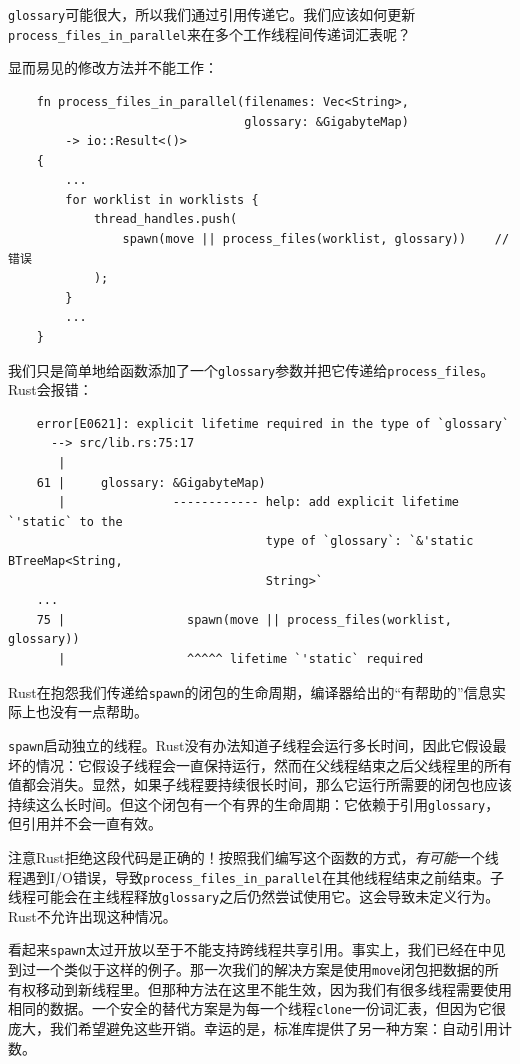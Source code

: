 \texttt{glossary}可能很大，所以我们通过引用传递它。我们应该如何更新\\
\texttt{process\_files\_in\_parallel}来在多个工作线程间传递词汇表呢？

显而易见的修改方法并不能工作：
\begin{verbatim}
    fn process_files_in_parallel(filenames: Vec<String>,
                                 glossary: &GigabyteMap)
        -> io::Result<()>
    {
        ...
        for worklist in worklists {
            thread_handles.push(
                spawn(move || process_files(worklist, glossary))    // 错误
            );
        }
        ...
    }
\end{verbatim}

我们只是简单地给函数添加了一个\texttt{glossary}参数并把它传递给\texttt{process\_files}。Rust会报错：
\begin{verbatim}
    error[E0621]: explicit lifetime required in the type of `glossary`
      --> src/lib.rs:75:17
       |
    61 |     glossary: &GigabyteMap)
       |               ------------ help: add explicit lifetime `'static` to the 
                                    type of `glossary`: `&'static BTreeMap<String,
                                    String>`
    ...
    75 |                 spawn(move || process_files(worklist, glossary))
       |                 ^^^^^ lifetime `'static` required
\end{verbatim}

Rust在抱怨我们传递给\texttt{spawn}的闭包的生命周期，编译器给出的“有帮助的”信息实际上也没有一点帮助。

\texttt{spawn}启动独立的线程。Rust没有办法知道子线程会运行多长时间，因此它假设最坏的情况：它假设子线程会一直保持运行，然而在父线程结束之后父线程里的所有值都会消失。显然，如果子线程要持续很长时间，那么它运行所需要的闭包也应该持续这么长时间。但这个闭包有一个有界的生命周期：它依赖于引用\texttt{glossary}，但引用并不会一直有效。

注意Rust拒绝这段代码是正确的！按照我们编写这个函数的方式，\emph{有可能}一个线程遇到I/O错误，导致\texttt{process\_files\_in\_parallel}在其他线程结束之前结束。子线程可能会在主线程释放\texttt{glossary}之后仍然尝试使用它。这会导致未定义行为。Rust不允许出现这种情况。

看起来\texttt{spawn}太过开放以至于不能支持跨线程共享引用。事实上，我们已经在中见到过一个类似于这样的例子。那一次我们的解决方案是使用\texttt{move}闭包把数据的所有权移动到新线程里。但那种方法在这里不能生效，因为我们有很多线程需要使用相同的数据。一个安全的替代方案是为每一个线程\texttt{clone}一份词汇表，但因为它很庞大，我们希望避免这些开销。幸运的是，标准库提供了另一种方案：自动引用计数。

